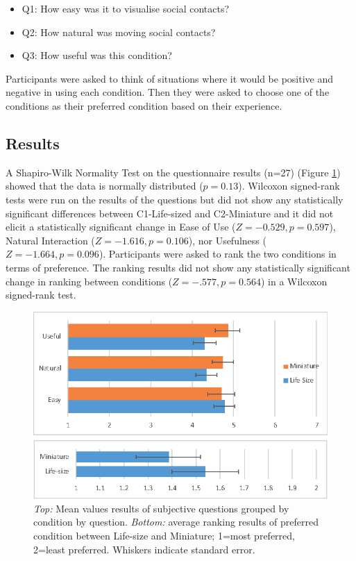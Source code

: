 \begin{itemize}
    \item Q1: How easy was it to visualise social contacts?
    \item Q2: How natural was moving social contacts?
    \item Q3: How useful was this condition?
\end{itemize}

Participants were asked to think of situations where it would be positive and negative in using each condition. Then they were asked to choose one of the conditions as their preferred condition based on their experience.

\subsection{Results}

A Shapiro-Wilk Normality Test on the questionnaire results (n=27) (Figure \ref{fig:continuum:results}) showed that the data is normally distributed ($p=0.13$). Wilcoxon signed-rank tests were run on the results of the questions but did not show any statistically significant differences between C1-Life-sized and C2-Miniature and it did not elicit a statistically significant change in Ease of Use ($Z=-0.529, p=0.597$), Natural Interaction ($Z=-1.616, p=0.106$), nor Usefulness ($Z=-1.664, p=0.096$). Participants were asked to rank the two conditions in terms of preference. The ranking results did not show any statistically significant change in ranking between conditions ($Z=-.577, p=0.564$) in a Wilcoxon signed-rank test.

\begin{figure}[ht]
    \centering
    \includegraphics[width=0.8\linewidth]{images/42-placement-ismar17/images-09.eps}
    \caption{\textit{Top:} Mean values results of subjective questions grouped by condition by question. \textit{Bottom:} average ranking results of preferred condition between Life-size and Miniature; 1=most preferred, 2=least preferred. Whiskers indicate standard error.}
    \label{fig:continuum:results}
\end{figure}


